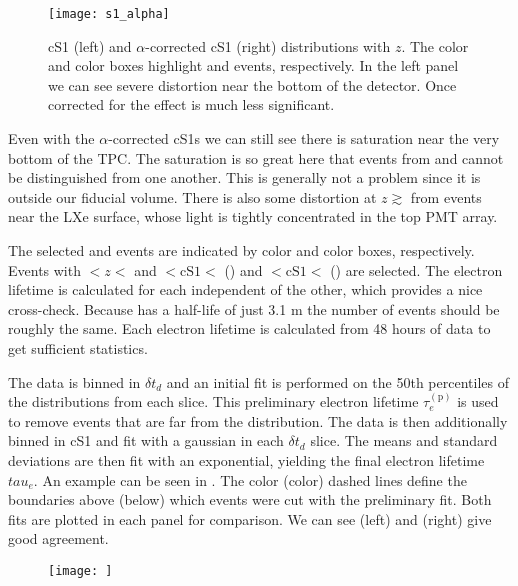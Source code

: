 \begin{figure}
\centering
\texttt{[image: s1\_alpha]}
\caption{cS1 (left) and $\alpha$-corrected cS1 (right) distributions with $z$.  The color and color boxes highlight  and
 events, respectively.  In the left panel we can see severe distortion near the bottom of the detector.  Once corrected for
the effect is much less significant.}
\label{fig:electron_lifetimes_measurement_alphas_s1}
\end{figure}

Even with the $\alpha$-corrected cS1s we can still see there is saturation near the very bottom of the TPC.  The saturation is so great
here that events from  and  cannot be distinguished from one another.  This is generally not a problem since it
is outside our fiducial volume.  There is also some distortion at $z \gtrsim$ from events
near the LXe surface, whose light is tightly concentrated in the top PMT array.

The selected  and  events are indicated by color and color boxes, respectively.  Events with $< z < $ and
$< \mathrm{cS1} < $ () and $< \mathrm{cS1} <$ () are selected.  The electron lifetime is calculated for each
independent of the other, which provides a nice cross-check.  Because  has a half-life of just 3.1 m the number of events
should be roughly the same.  Each electron lifetime is calculated from 48 hours of data to get sufficient statistics.

The data is binned in $\delta t_d$ and an initial fit is performed on the 50th percentiles of the \stwob distributions from each
slice.  This preliminary electron lifetime $\tau_e^{(\mathrm{p})}$ is used to remove events that are far from the distribution.  The data
is then additionally binned in cS1 and fit with a gaussian in each $\delta t_d$ slice.  The means and standard deviations are then fit
with an exponential, yielding the final electron lifetime $tau_e$.  An example can be seen in
.  The color (color) dashed lines define the boundaries above (below) which
events were cut with the preliminary fit.  Both fits are plotted in each panel for comparison.  We can see  (left) and
 (right) give good agreement.

\begin{figure}
\centering
\texttt{[image: ]}
\caption{}
\label{fig:electron_lifetimes_measurement_alphas_elifetime}
\end{figure}

